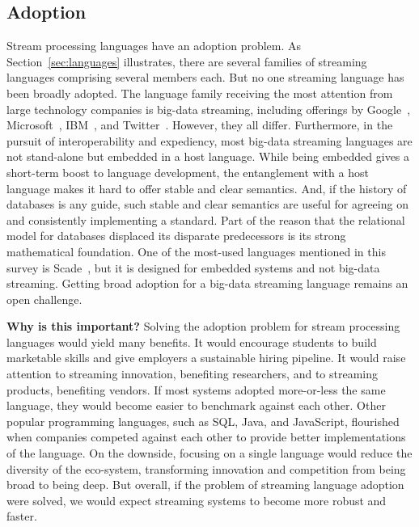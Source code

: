 \subsection{Adoption}\label{sec:adoption} %

Stream processing languages have an adoption problem. As
Section~\ref{sec:languages} illustrates, there are several families of
streaming languages comprising several members each.  But no one
streaming language has been broadly adopted. The language family
receiving the most attention from large technology companies is
big-data streaming, including offerings by
Google~\cite{akidau_et_al_2013}, Microsoft~\cite{ali_et_al_2009},
IBM~\cite{hirzel_schneider_gedik_2017}, and
Twitter~\cite{toshniwal_et_al_2014}. However, they all differ.
Furthermore, in the pursuit of interoperability and expediency, most
big-data streaming languages are not stand-alone but embedded in a
host language. While being embedded gives a short-term boost to
language development, the entanglement with a host language makes it
hard to offer stable and clear semantics. And, if the history of
databases is any guide, such stable and clear semantics are useful for
agreeing on and consistently implementing a standard. Part of the
reason that the relational model for databases displaced its disparate
predecessors is its strong mathematical foundation.  One of the
most-used languages mentioned in this survey is
Scade~\cite{scade_2017}, but it is designed for embedded systems and
not big-data streaming. Getting broad adoption for a big-data
streaming language remains an open challenge.

\textbf{Why is this important?}
%
Solving the adoption problem for stream processing languages would
yield many benefits. It would encourage students to build marketable
skills and give employers a sustainable hiring pipeline.
It would raise attention to streaming innovation, benefiting
researchers, and to streaming products, benefiting vendors.
If most systems adopted more-or-less
the same language, they would become easier to benchmark against each
other. Other popular programming languages, such as SQL, Java, and
JavaScript, flourished when companies competed against each other
to provide better implementations of the language.  On the downside,
focusing on a single language would reduce the diversity of the
eco-system, transforming innovation and competition from being broad
to being deep. But overall, if the problem of streaming language
adoption were solved, we would expect streaming systems to become more
robust and faster.

